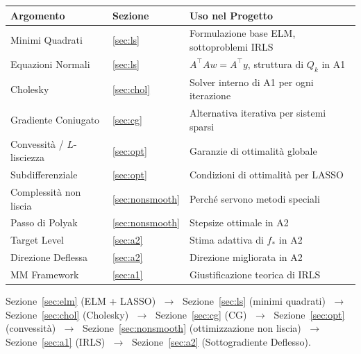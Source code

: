\documentclass[11pt,a4paper]{article}
\theoremstyle{definition}
\theoremstyle{plain}
\theoremstyle{remark}
\newcommand{\T}{^{\top}}
\begin{document}
\begin{center}
  \renewcommand{\arraystretch}{1.2}
  \begin{tabular}{lll}
    \toprule
    \textbf{Argomento} & \textbf{Sezione} & \textbf{Uso nel Progetto} \\
    \midrule
    Minimi Quadrati & \ref{sec:ls} & Formulazione base ELM, sottoproblemi IRLS \\
    Equazioni Normali & \ref{sec:ls} & $A\T Aw = A\T y$, struttura di $Q_k$ in A1 \\
    Cholesky & \ref{sec:chol} & Solver interno di A1 per ogni iterazione \\
    Gradiente Coniugato & \ref{sec:cg} & Alternativa iterativa per sistemi sparsi \\
    Convessità / $L$-lisciezza & \ref{sec:opt} & Garanzie di ottimalità globale \\
    Subdifferenziale & \ref{sec:opt} & Condizioni di ottimalità per LASSO \\
    Complessità non liscia & \ref{sec:nonsmooth} & Perché servono metodi speciali \\
    Passo di Polyak & \ref{sec:nonsmooth} & Stepsize ottimale in A2 \\
    Target Level & \ref{sec:a2} & Stima adattiva di $f_*$ in A2 \\
    Direzione Deflessa & \ref{sec:a2} & Direzione migliorata in A2 \\
    MM Framework & \ref{sec:a1} & Giustificazione teorica di IRLS \\
    \bottomrule
  \end{tabular}
\end{center}

\vspace{1em}

\begin{keybox}
  Sezione~\ref{sec:elm} (ELM + LASSO)
  $\;\to\;$ Sezione~\ref{sec:ls} (minimi quadrati)
  $\;\to\;$ Sezione~\ref{sec:chol} (Cholesky)
  $\;\to\;$ Sezione~\ref{sec:cg} (CG)
  $\;\to\;$ Sezione~\ref{sec:opt} (convessità)
  $\;\to\;$ Sezione~\ref{sec:nonsmooth} (ottimizzazione non liscia)
  $\;\to\;$ Sezione~\ref{sec:a1} (IRLS)
  $\;\to\;$ Sezione~\ref{sec:a2} (Sottogradiente Deflesso).
\end{keybox}
\end{document}
